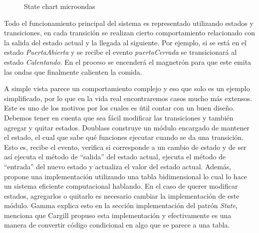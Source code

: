\begin{figure}[h]
\caption{State chart microondas}
\begin{center}
\end{center}
\end{figure}

Todo el funcionamiento principal del sistema es representado utilizando estados y transiciones, en cada transición se realizan cierto comportamiento relacionado con la salida del estado actual y la llegada al siguiente. Por ejemplo, si se está en el estado \textit{PuertaAbierta} y se recibe el evento \textit{puertaCerrada} se transicionará al estado \textit{Calentando}. En el proceso se encenderá el magnetrón para que este emita las ondas que finalmente calienten la comida.

A simple vista parece un comportamiento complejo y eso que solo es un ejemplo simplificado, por lo que en la vida real encontraremos casos mucho más extensos. Este es uno de los motivos por los cuales es útil contar con un buen diseño. Debemos tener en cuenta que sea fácil modificar las transiciones y también agregar y quitar estados. Doublass construye un módulo encargado de mantener el estado, el cual que sabe qué funciones ejecutar cuando se da una transición. Esto es, recibe el evento, verifica si corresponde a un cambio de estado y de ser así ejecuta el método de ``salida'' del estado actual, ejecuta el método de ``entrada'' del nuevo estado y actualiza el valor del estado actual. Además, propone una implementación utilizando una tabla bidimensional lo cual lo hace un sistema eficiente computacional hablando. En el caso de querer modificar estados, agregarlos o quitarlo es necesario cambiar la implementación de este módulo. Gamma explica esto en la sección implementación del patrón \textit{State}, menciona que Cargill propuso esta implementación y efectivamente es una manera de convertir código condicional en algo que se parece a una tabla.

